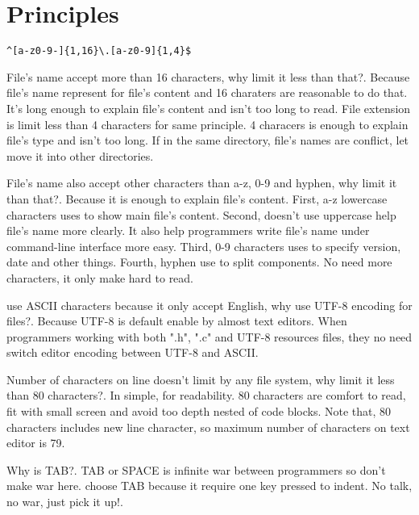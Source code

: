 \section{Principles}

\begin{crules}
     \verb/^[a-z0-9-]{1,16}\.[a-z0-9]{1,4}$/
\end{crules}

File's name accept more than 16 characters, why limit it less than that?.
Because file's name represent for file's content and 16 charaters are
reasonable to do that. It's long enough to explain file's content and
isn't too long to read. File extension is limit less than 4 characters for
same principle. 4 characers is enough to explain file's type and isn't
too long. If in the same directory, file's names are conflict, let move
it into other directories.

File's name also accept other characters than a-z, 0-9 and hyphen,
why limit it than that?. Because it is enough to explain file's content.
First, a-z lowercase characters uses to show main file's content.
Second, doesn't use uppercase help file's name more clearly. It also help
programmers write file's name under \mbox{command-line} interface more easy.
Third, 0-9 characters uses to specify version, date and other things.
Fourth, hyphen use to split components. No need more characters,
it only make hard to read.

\pkgname{} use ASCII characters because it only accept English, why use
\mbox{UTF-8} encoding for files?. Because \mbox{UTF-8} is default enable by
almost text editors. When programmers working with both ".h", ".c" and
\mbox{UTF-8} resources files, they no need switch editor encoding between
\mbox{UTF-8} and ASCII.

Number of characters on line doesn't limit by any file system, why limit it
less than 80 characters?. In simple, for readability. 80 characters are
comfort to read, fit with small screen and avoid too depth nested of
code blocks. Note that, 80 characters includes new line character,
so maximum number of characters on text editor is 79.

Why is TAB?. TAB or SPACE is infinite war between programmers so don't
make war here. \pkgname{} choose TAB because it require one key pressed to
indent. No talk, no war, just pick it up!.
